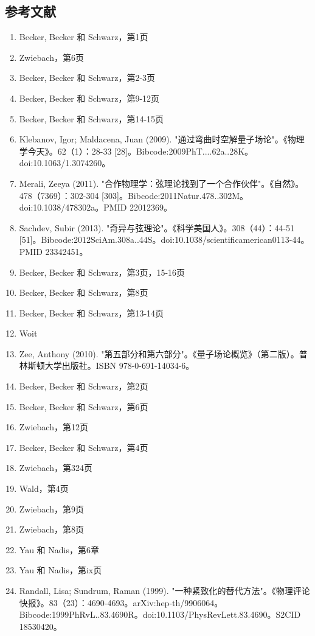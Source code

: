 \subsection{参考文献}  
\begin{enumerate}
\item Becker, Becker 和 Schwarz，第1页  
\item Zwiebach，第6页  
\item Becker, Becker 和 Schwarz，第2-3页  
\item Becker, Becker 和 Schwarz，第9-12页  
\item Becker, Becker 和 Schwarz，第14-15页  
\item Klebanov, Igor; Maldacena, Juan (2009). "通过弯曲时空解量子场论"。《物理学今天》。62（1）：28-33 [28]。Bibcode:2009PhT....62a..28K。doi:10.1063/1.3074260。  
\item Merali, Zeeya (2011). "合作物理学：弦理论找到了一个合作伙伴"。《自然》。478（7369）：302-304 [303]。Bibcode:2011Natur.478..302M。doi:10.1038/478302a。PMID 22012369。  
\item Sachdev, Subir (2013). "奇异与弦理论"。《科学美国人》。308（44）：44-51 [51]。Bibcode:2012SciAm.308a..44S。doi:10.1038/scientificamerican0113-44。PMID 23342451。  
\item Becker, Becker 和 Schwarz，第3页，15-16页  
\item Becker, Becker 和 Schwarz，第8页
\item Becker, Becker 和 Schwarz，第13-14页  
\item Woit  
\item Zee, Anthony (2010). "第五部分和第六部分"。《量子场论概览》（第二版）。普林斯顿大学出版社。ISBN 978-0-691-14034-6。  
\item Becker, Becker 和 Schwarz，第2页  
\item Becker, Becker 和 Schwarz，第6页  
\item Zwiebach，第12页  
\item Becker, Becker 和 Schwarz，第4页  
\item Zwiebach，第324页  
\item Wald，第4页  
\item Zwiebach，第9页  
\item Zwiebach，第8页  
\item Yau 和 Nadis，第6章  
\item Yau 和 Nadis，第ix页  
\item Randall, Lisa; Sundrum, Raman (1999). "一种紧致化的替代方法"。《物理评论快报》。83（23）：4690-4693。arXiv:hep-th/9906064。Bibcode:1999PhRvL..83.4690R。doi:10.1103/PhysRevLett.83.4690。S2CID 18530420。
\end{enumerate}